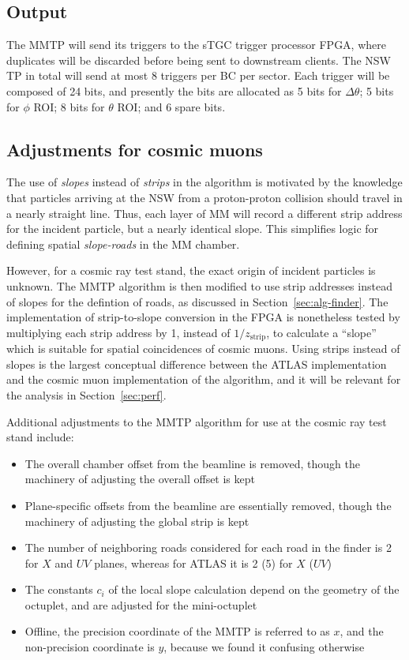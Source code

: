 \subsection{Output}
\label{sec:alg-output}

The MMTP will send its triggers to the sTGC trigger processor FPGA, where duplicates will be discarded before being sent to downstream clients. The NSW TP in total will send at most 8 triggers per BC per sector. Each trigger will be composed of 24 bits, and presently the bits are allocated as 5 bits for $\Delta\theta$; 5 bits for $\phi$ ROI; 8 bits for $\theta$ ROI; and 6 spare bits.

\subsection{Adjustments for cosmic muons}
\label{sec:alg-crts}

The use of \textit{slopes} instead of \textit{strips} in the algorithm is motivated by the knowledge that particles arriving at the NSW from a proton-proton collision should travel in a nearly straight line. Thus, each layer of MM will record a different strip address for the incident particle, but a nearly identical slope. This simplifies logic for defining spatial \textit{slope-roads} in the MM chamber.

However, for a cosmic ray test stand, the exact origin of incident particles is unknown. The MMTP algorithm is then modified to use strip addresses instead of slopes for the defintion of roads, as discussed in Section~\ref{sec:alg-finder}. The implementation of strip-to-slope conversion in the FPGA is nonetheless tested by multiplying each strip address by 1, instead of $1/z_\text{strip}$, to calculate a ``slope'' which is suitable for spatial coincidences of cosmic muons. Using strips instead of slopes is the largest conceptual difference between the ATLAS implementation and the cosmic muon implementation of the algorithm, and it will be relevant for the analysis in Section~\ref{sec:perf}.

Additional adjustments to the MMTP algorithm for use at the cosmic ray test stand include:

\begin{itemize}
  \item The overall chamber offset from the beamline is removed, though the machinery of adjusting the overall offset is kept
  \item Plane-specific offsets from the beamline are essentially removed, though the machinery of adjusting the global strip is kept
  \item The number of neighboring roads considered for each road in the finder is 2 for $X$ and $UV$ planes, whereas for ATLAS it is 2 (5) for $X$ ($UV$)
  \item The constants $c_i$ of the local slope calculation depend on the geometry of the octuplet, and are adjusted for the mini-octuplet
  \item Offline, the precision coordinate of the MMTP is referred to as $x$, and the non-precision coordinate is $y$, because we found it confusing otherwise
\end{itemize}

